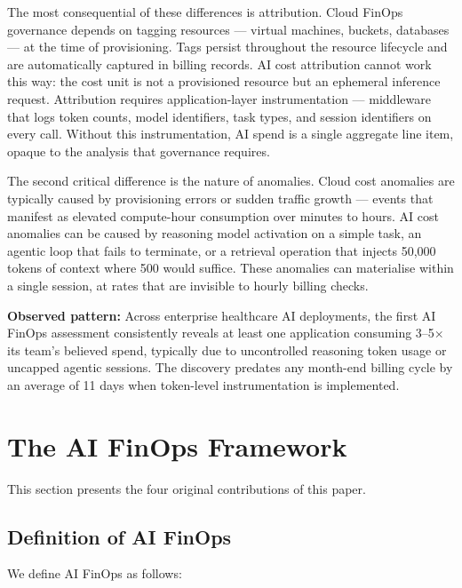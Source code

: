 \documentclass[11pt,twocolumn]{article}
\begin{document}
The most consequential of these differences is attribution. Cloud FinOps governance
depends on tagging resources --- virtual machines, buckets, databases --- at
the time of provisioning. Tags persist throughout the resource lifecycle and are
automatically captured in billing records. AI cost attribution cannot work this way:
the cost unit is not a provisioned resource but an ephemeral inference request.
Attribution requires application-layer instrumentation --- middleware that logs
token counts, model identifiers, task types, and session identifiers on every
call. Without this instrumentation, AI spend is a single aggregate line item,
opaque to the analysis that governance requires.

The second critical difference is the nature of anomalies. Cloud cost anomalies
are typically caused by provisioning errors or sudden traffic growth ---
events that manifest as elevated compute-hour consumption over minutes to hours.
AI cost anomalies can be caused by reasoning model activation on a simple task,
an agentic loop that fails to terminate, or a retrieval operation that injects
50,000 tokens of context where 500 would suffice. These anomalies can materialise
within a single session, at rates that are invisible to hourly billing checks.

\begin{callout}
\small\textbf{Observed pattern:} Across enterprise healthcare AI deployments,
the first AI FinOps assessment consistently reveals at least one application
consuming 3--5$\times$ its team's believed spend, typically due to uncontrolled
reasoning token usage or uncapped agentic sessions. The discovery predates
any month-end billing cycle by an average of 11 days when token-level
instrumentation is implemented.
\end{callout}

\section{The AI FinOps Framework}
\label{sec:framework}

This section presents the four original contributions of this paper.

\subsection{Definition of AI FinOps}
\label{sec:definition}

We define AI FinOps as follows:
\end{document}
